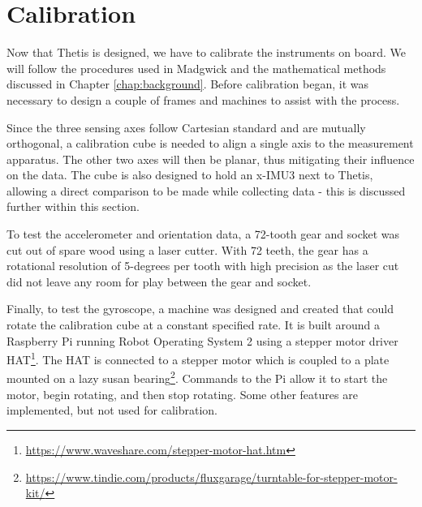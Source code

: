 \chapter{Calibration} 
Now that Thetis is designed, we have to calibrate the instruments on board.
We will follow the procedures used in Madgwick \cite{Madgwick:dissertation} and the mathematical methods discussed in Chapter \ref{chap:background}.
Before calibration began, it was necessary to design a couple of frames and machines to assist with the process.

Since the three sensing axes follow Cartesian standard and are mutually orthogonal, a calibration cube is needed to align a single axis to the measurement apparatus.
The other two axes will then be planar, thus mitigating their influence on the data.
The cube is also designed to hold an x-IMU3 \cite{xioTechnologies} next to Thetis, allowing a direct comparison to be made while collecting data - this is discussed further within this section.


To test the accelerometer and orientation data, a 72-tooth gear and socket was cut out of spare wood using a laser cutter.
With 72 teeth, the gear has a rotational resolution of 5-degrees per tooth with high precision as the laser cut did not leave any room for play between the gear and socket.


Finally, to test the gyroscope, a machine was designed and created that could rotate the calibration cube at a constant specified rate.
It is built around a Raspberry Pi running Robot Operating System 2 \cite{Macenski:2022} using a stepper motor driver HAT\footnote{\url{https://www.waveshare.com/stepper-motor-hat.htm}}.
The HAT is connected to a stepper motor which is coupled to a plate mounted on a lazy susan bearing\footnote{\url{https://www.tindie.com/products/fluxgarage/turntable-for-stepper-motor-kit/}}.
Commands to the Pi allow it to start the motor, begin rotating, and then stop rotating.
Some other features are implemented, but not used for calibration.

